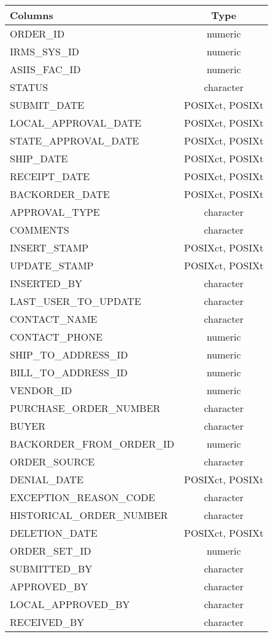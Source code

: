 \documentclass[
  letterpaper,
  DIV=11,
  numbers=noendperiod]{scrreprt}
\begin{document}
\begin{longtable}{lc}
\toprule
Columns & Type \\ 
\midrule
ORDER\_ID & numeric \\ 
IRMS\_SYS\_ID & numeric \\ 
ASIIS\_FAC\_ID & numeric \\ 
STATUS & character \\ 
SUBMIT\_DATE & POSIXct, POSIXt \\ 
LOCAL\_APPROVAL\_DATE & POSIXct, POSIXt \\ 
STATE\_APPROVAL\_DATE & POSIXct, POSIXt \\ 
SHIP\_DATE & POSIXct, POSIXt \\ 
RECEIPT\_DATE & POSIXct, POSIXt \\ 
BACKORDER\_DATE & POSIXct, POSIXt \\ 
APPROVAL\_TYPE & character \\ 
COMMENTS & character \\ 
INSERT\_STAMP & POSIXct, POSIXt \\ 
UPDATE\_STAMP & POSIXct, POSIXt \\ 
INSERTED\_BY & character \\ 
LAST\_USER\_TO\_UPDATE & character \\ 
CONTACT\_NAME & character \\ 
CONTACT\_PHONE & numeric \\ 
SHIP\_TO\_ADDRESS\_ID & numeric \\ 
BILL\_TO\_ADDRESS\_ID & numeric \\ 
VENDOR\_ID & numeric \\ 
PURCHASE\_ORDER\_NUMBER & character \\ 
BUYER & character \\ 
BACKORDER\_FROM\_ORDER\_ID & numeric \\ 
ORDER\_SOURCE & character \\ 
DENIAL\_DATE & POSIXct, POSIXt \\ 
EXCEPTION\_REASON\_CODE & character \\ 
HISTORICAL\_ORDER\_NUMBER & character \\ 
DELETION\_DATE & POSIXct, POSIXt \\ 
ORDER\_SET\_ID & numeric \\ 
SUBMITTED\_BY & character \\ 
APPROVED\_BY & character \\ 
LOCAL\_APPROVED\_BY & character \\ 
RECEIVED\_BY & character \\ 

\end{longtable}
\end{document}
